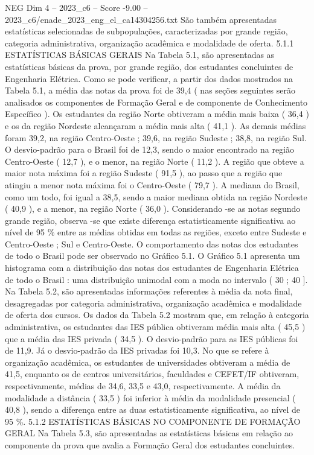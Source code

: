\begin{textsample}{NEG Dim 4 – 2023\_c6 – Score -9.00 – 2023\_c6/enade\_2023\_eng\_el\_ca14304256.txt}
São também apresentadas estatísticas selecionadas de subpopulações, caracterizadas por grande região, categoria administrativa, organização acadêmica e modalidade de oferta. 5.1.1 ESTATÍSTICAS BÁSICAS GERAIS Na Tabela 5.1, são apresentadas as estatísticas básicas da prova, por grande região, dos estudantes concluintes de Engenharia Elétrica.
Como se pode verificar, a partir dos dados mostrados na Tabela 5.1, a média das notas da prova foi de 39,4 ( nas seções seguintes serão analisados os componentes de Formação Geral e de componente de Conhecimento Específico ).
Os estudantes da região Norte obtiveram a média mais baixa ( 36,4 ) e os da região Nordeste alcançaram a média mais alta ( 41,1 ).
As demais médias foram 39,2, na região Centro-Oeste ; 39,6, na região Sudeste ; 38,8, na região Sul.
O desvio-padrão para o Brasil foi de 12,3, sendo o maior encontrado na região Centro-Oeste ( 12,7 ), e o menor, na região Norte ( 11,2 ).
A região que obteve a maior nota máxima foi a região Sudeste ( 91,5 ), ao passo que a região que atingiu a menor nota máxima foi o Centro-Oeste ( 79,7 ).
A mediana do Brasil, como um todo, foi igual a 38,5, sendo a maior mediana obtida na região Nordeste ( 40,9 ), e a menor, na região Norte ( 36,0 ).
Considerando -se as notas segundo grande região, observa -se que existe diferença estatisticamente significativa ao nível de 95 \% entre as médias obtidas em todas as regiões, exceto entre Sudeste e Centro-Oeste ; Sul e Centro-Oeste.
O comportamento das notas dos estudantes de todo o Brasil pode ser observado no Gráfico 5.1.
O Gráfico 5.1 apresenta um histograma com a distribuição das notas dos estudantes de Engenharia Elétrica de todo o Brasil : uma distribuição unimodal com a moda no intervalo ( 30 ; 40 ].
Na Tabela 5.2, são apresentadas informações referentes à média da nota final, desagregadas por categoria administrativa, organização acadêmica e modalidade de oferta dos cursos.
Os dados da Tabela 5.2 mostram que, em relação à categoria administrativa, os estudantes das IES pública obtiveram média mais alta ( 45,5 ) que a média das IES privada ( 34,5 ).
O desvio-padrão para as IES públicas foi de 11,9.
Já o desvio-padrão da IES privadas foi 10,3.
No que se refere à organização acadêmica, os estudantes de universidades obtiveram a média de 41,5, enquanto os de centros universitários, faculdades e CEFET/IF obtiveram, respectivamente, médias de 34,6, 33,5 e 43,0, respectivamente.
A média da modalidade a distância ( 33,5 ) foi inferior à média da modalidade presencial ( 40,8 ), sendo a diferença entre as duas estatisticamente significativa, ao nível de 95 \%. 5.1.2 ESTATÍSTICAS BÁSICAS NO COMPONENTE DE FORMAÇÃO GERAL Na Tabela 5.3, são apresentadas as estatísticas básicas em relação ao componente da prova que avalia a Formação Geral dos estudantes concluintes.

\end{textsample}

